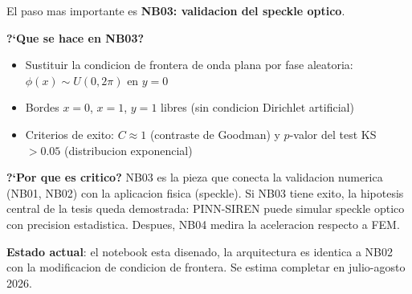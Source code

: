 \begin{answerbox}
El paso mas importante es \textbf{NB03: validacion del speckle optico}.

\textbf{?`Que se hace en NB03?}
\begin{itemize}
  \item Sustituir la condicion de frontera de onda plana por fase aleatoria:
        $\phi(x) \sim U(0, 2\pi)$ en $y=0$
  \item Bordes $x=0$, $x=1$, $y=1$ libres (sin condicion Dirichlet artificial)
  \item Criterios de exito: $C \approx 1$ (contraste de Goodman) y
        $p$-valor del test KS $> 0.05$ (distribucion exponencial)
\end{itemize}

\textbf{?`Por que es critico?}
NB03 es la pieza que conecta la validacion numerica (NB01, NB02) con la
aplicacion fisica (speckle). Si NB03 tiene exito, la hipotesis central de la
tesis queda demostrada: PINN-SIREN puede simular speckle optico con precision
estadistica. Despues, NB04 medira la aceleracion respecto a FEM.

\textbf{Estado actual}: el notebook esta disenado, la arquitectura es identica
a NB02 con la modificacion de condicion de frontera. Se estima completar en
julio-agosto 2026.
\end{answerbox}

\vspace{16pt}

